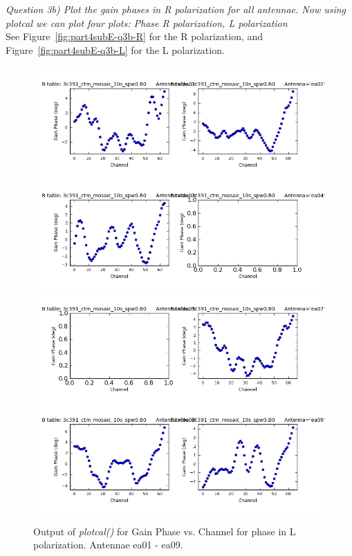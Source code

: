 \documentclass[12pt, a4paper]{article}
\begin{document}
\newpage


\noindent \textit{Question 3b) Plot the gain phases in R polarization for all antennae. Now using plotcal we can plot four plots: Phase R polarization, L polarization} \\
See Figure~\ref{fig:part4subE-q3b-R} for the R polarization, and Figure~\ref{fig:part4subE-q3b-L} for the L polarization. \\

\newpage
\begin{figure}[h!]
\centering
\includegraphics[scale=0.65]{../Imaging/plots2/part4-subE-question3b_phase_pol-L-ea01-ea04.png}
\includegraphics[scale=0.65]{../Imaging/plots2/part4-subE-question3b_phase_pol-L-ea05-ea09.png}
\caption{Output of \emph{plotcal()} for Gain Phase vs. Channel for phase in L polarization. Antennae ea01 - ea09.}
\end{figure}
\addtocounter{figure}{-1}
\end{document}
